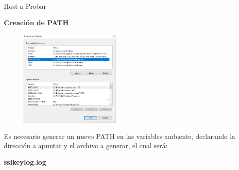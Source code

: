 
\begin{frame}[t,plain]
\titlepage
\end{frame}




\begin{frame}[t]{Host a Probar}

\textbf{Creación de PATH}

\begin{figure} 
\vspace{2pt}
  \begin{center}
    \includegraphics[width=0.45\textwidth]{sslpath.png}
    \label{fig:databaseUserTable}
  \end{center}
  \vspace{2pt}
\end{figure} 

\bigskip

Es necesario generar un nuevo PATH en las variables ambiente, declarando la dirección a apuntar y el archivo a generar, el cual será:

\begin{center}
   \textbf{sslkeylog.log}
\end{center}


\end{frame}



